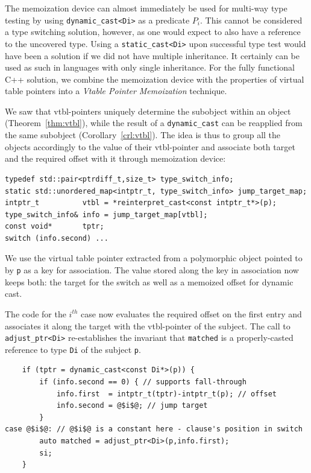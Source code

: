 \documentclass[preprint]{sigplanconf}
\makeatletter
\DeclareRobustCommand{\code}[1]{{\lstinline[breaklines=false,escapechar=@]{#1}}}
\makeatother
\begin{document}
The memoization device can almost immediately be used for multi-way type testing by 
using \code{dynamic_cast<Di>} as a predicate $P_i$. This cannot be considered a 
type switching solution, however, as one would expect to also have a reference 
to the uncovered type. Using a \code{static_cast<Di>} upon successful type test 
would have been a solution if we did not have multiple inheritance. It certainly 
can be used as such in languages with only single inheritance. For the fully 
functional C++ solution, we combine the memoization device with the properties 
of virtual table pointers into a \emph{Vtable Pointer Memoization} technique.

We saw that vtbl-pointers uniquely determine the subobject within an object 
(Theorem~\ref{thm:vtbl}), while the result of a \code{dynamic_cast} can be reapplied 
from the same subobject (Corollary~\ref{crl:vtbl}). The idea is thus to group 
all the objects accordingly to the value of their vtbl-pointer and associate both 
target and the required offset with it through memoization device:

\begin{lstlisting}
typedef std::pair<ptrdiff_t,size_t> type_switch_info;
static std::unordered_map<intptr_t, type_switch_info> jump_target_map;
intptr_t          vtbl = *reinterpret_cast<const intptr_t*>(p);
type_switch_info& info = jump_target_map[vtbl];
const void*       tptr; 
switch (info.second) ...
\end{lstlisting}

\noindent
We use the virtual table pointer extracted from a polymorphic object pointed to 
by \code{p} as a key for association. The value stored along the key in 
association now keeps both: the target for the switch as well as a memoized 
offset for dynamic cast. 

The code for the $i^{th}$ case now evaluates the required offset on the first 
entry and associates it along the target with the vtbl-pointer of the subject.
The call to \code{adjust_ptr<Di>} re-establishes the invariant that 
\code{matched} is a properly-casted reference to type \code{Di} of the subject 
\code{p}.

\begin{lstlisting}
    if (tptr = dynamic_cast<const Di*>(p)) {
        if (info.second == 0) { // supports fall-through
            info.first  = intptr_t(tptr)-intptr_t(p); // offset
            info.second = @$i$@; // jump target
        }
case @$i$@: // @$i$@ is a constant here - clause's position in switch
        auto matched = adjust_ptr<Di>(p,info.first); 
        si;
    }
\end{lstlisting}
\end{document}
